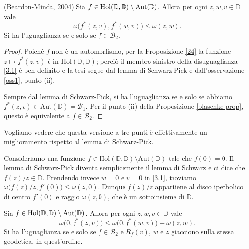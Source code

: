 \begin{thm} \label{31}
  (Beardon-Minda, 2004) Sia $f \in \text{\normalfont{Hol}}(\mathbb{D},\mathbb{D})\setminus\text{\normalfont{Aut}}(\mathbb{D})$. Allora per ogni $z, w, v \in \mathbb{D}$ vale
  \begin{equation} \label{3.1}
    \omega\bigl(f^*(z,v),f^*(w,v)\bigr) \le \omega(z,w).
  \end{equation}
  Si ha l'uguaglianza se e solo se $f \in \mathcal{B}_2$.
\end{thm}

\begin{proof}
  Poiché $f$ non è un automorfismo, per la Proposizione \ref{24} la funzione $z \longmapsto f^*(z,v)$ è in $\text{Hol}(\mathbb{D}, \mathbb{D})$; perciò il membro sinistro della disuguaglianza \eqref{3.1} è ben definito e la tesi segue dal lemma di Schwarz-Pick e dall'osservazione \ref{oss1}, punto (ii).

  Sempre dal lemma di Schwarz-Pick, si ha l'uguaglianza se e solo se abbiamo $f^*(z,v) \in \text{Aut}(\mathbb{D})=\mathcal{B}_1$. Per il punto (ii) della Proposizione \ref{blaschke-prop}, questo è equivalente a $f \in \mathcal{B}_2$.
\end{proof}

Vogliamo vedere che questa versione a tre punti è effettivamente un miglioramento rispetto al lemma di Schwarz-Pick.

\begin{ex}
  Consideriamo una funzione $f \in \text{Hol}(\mathbb{D},\mathbb{D})\setminus\text{Aut}(\mathbb{D})$ tale che $f(0)=0$. Il lemma di Schwarz-Pick diventa semplicemente il lemma di Schwarz e ci dice che $f(z)/z \in \mathbb{D}$. Prendendo invece $w=0$ e $v=0$ in \eqref{3.1}, troviamo $\omega\bigl(f(z)/z,f'(0)\bigr) \le \omega(z,0)$.
  Dunque $f(z)/z$ appartiene al disco iperbolico di centro $f'(0)$ e raggio $\omega(z,0)$, che è un sottoinsieme di $\mathbb{D}$.
\end{ex}

\begin{cor} \label{32}
  Sia $f \in \text{\normalfont{Hol}}(\mathbb{D},\mathbb{D})\setminus\text{\normalfont{Aut}}(\mathbb{D})$. Allora per ogni $z, w, v \in \mathbb{D}$ vale
  \begin{equation}
    \omega\bigl(0, f^*(z,v)\bigr) \le \omega\bigl(0,f^*(w,v)\bigr)+\omega(z,w).
  \end{equation}
  Si ha l'uguaglianza se e solo se $f \in \mathcal{B}_2$ e $R_f(v)$, $w$ e $z$ giacciono sulla stessa geodetica, in quest'ordine.
\end{cor}

